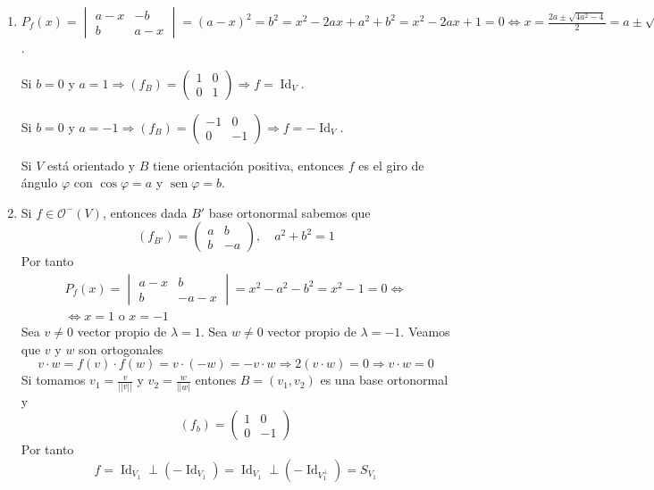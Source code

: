 \documentclass[12pt, a4paper, ones, notitlepage, openany,titlepage]{article}
\begin{document}
\begin{enumerate}[label=(\arabic*)]
	\item $\displaystyle P_f(x) = \begin{vmatrix}
		a - x & - b \\
		b & a - x
	\end{vmatrix} = (a - x)^2 = b^2 = x^2 - 2ax + a^2 + b^2 = x^2 - 2ax + 1 = 0 \Longleftrightarrow x = \frac{2a \pm \sqrt{4a^2 - 4}}{2} = a \pm \sqrt{a^2 - 1} = a \pm \sqrt{-b^2} = a \pm bi$.
	
	Si $b = 0$ y $a = 1 \Longrightarrow (f_B) = \begin{pmatrix}
		1 & 0 \\
		0 & 1
	\end{pmatrix} \Longrightarrow f = \operatorname{Id}_V$.
	
	Si $b = 0$ y $a = -1 \Longrightarrow (f_B) = \begin{pmatrix}
		-1 & 0 \\
		0 & -1
	\end{pmatrix} \Longrightarrow f = -\operatorname{Id}_V$.
	
	Si $V$ está orientado y $B$ tiene orientación positiva, entonces $f$ es el giro de ángulo $\varphi$ con $\operatorname{cos}\varphi = a$ y $\operatorname{sen}\varphi = b$.
	
	\item Si $f \in \mathcal{O}^-(V)$, entonces dada $B'$ base ortonormal sabemos que
	$$
	(f_{B'}) = \begin{pmatrix}
		a & b \\
		b & -a
	\end{pmatrix}, \quad a^2 + b^2 = 1
	$$
	Por tanto
	\begin{gather*}
		P_f(x) = \begin{vmatrix}
			a - x & b \\
			b & - a - x
		\end{vmatrix} = x^2 - a^2 - b^2 = x^2 - 1 = 0 \Longleftrightarrow \\
		\Longleftrightarrow x = 1 \text{ o } x = -1
	\end{gather*}
	Sea $v \neq 0$ vector propio de $\lambda = 1$.
	Sea $w \neq 0$ vector propio de $\lambda = -1$.
	Veamos que $v$ y $w$ son ortogonales
	$$
	v \cdot w = f(v) \cdot f(w) = v \cdot (-w) = - v \cdot w \Longrightarrow 2(v \cdot w) = 0 \Longrightarrow v \cdot w = 0
	$$
	Si tomamos $v_1 = \frac{v}{||v||}$ y $v_2 = \frac{w}{||w|}$ entones $B = (v_1, v_2)$ es una base ortonormal y
	$$
	(f_b) = \begin{pmatrix}
		1 & 0 \\
		0 & -1
	\end{pmatrix}
	$$
	Por tanto
	$$
	f = \operatorname{Id}_{V_1} \perp (-\operatorname{Id}_{V_1}) = \operatorname{Id}_{V_1} \perp (-\operatorname{Id}_{V_1^\perp}) = S_{V_1}
	$$
\end{enumerate}
\end{document}
